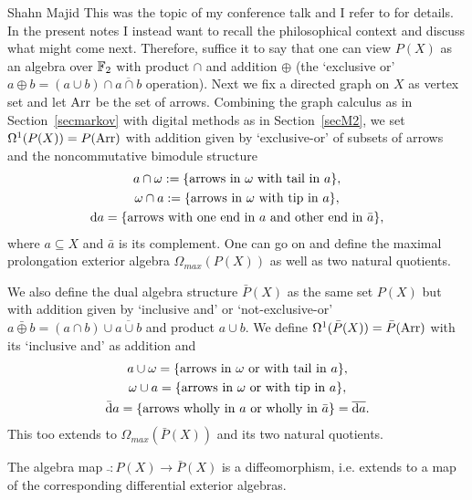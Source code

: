 \begin{artengenv}{Shahn Majid}
This was the topic of my conference talk and I refer to \parencite{Ma:boo} for details. In the present notes I instead want to recall the philosophical context and discuss what might come next. Therefore, suffice it to say that one can view $P(X)$ as an algebra over ${\mathbb{F}}_2$ with product $\cap$ and addition $\oplus$ (the `exclusive or' $a\oplus b=(a\cup b)\cap\overline{a\cap b}$ operation). Next we fix a directed graph on $X$ as vertex set and let ${\rm Arr}$ be the set of arrows. Combining the graph calculus as in Section~\ref{secmarkov} with digital methods as in Section~\ref{secM2}, we set $\Omega^1(P(X))=P({\rm Arr})$ with addition given by `exclusive-or' of subsets of arrows and the noncommutative bimodule structure \parencite{Ma:boo} 
\[\begin{gathered}
a\cap\omega:=\{{\rm arrows\ in\ }\omega\ {\rm with\ tail\ in\ }a\},\\
\omega\cap a:=\{{\rm arrows\ in\ }\omega\ {\rm with\ tip\ in\ }a\},\\
\extd a=\{{\rm arrows\ with\ one\ end\ in\ }a\ {\rm and\ other\ end\ in\ }\bar a\},
\end{gathered} \]
where $a\subseteq X$ and $\bar a$ is its complement. One can go on and define the maximal prolongation exterior algebra $\Omega_{max}(P(X))$ as well as two natural quotients. 

We also define the dual algebra structure $\bar P(X)$ as the same set $P(X)$ but with addition given by `inclusive and' or `not-exclusive-or' $a\bar\oplus b=(a\cap b) \cup \overline{a\cup b}$ and product $a\cup b$. We define $\Omega^1(\bar P(X))=\bar P({\rm Arr})$ with its `inclusive and'  as addition and \parencite{Ma:boo} 
\[\begin{gathered}
a\cup \omega=\{{\rm arrows\ in\ }\omega\ {\rm or\ with\ tail\ in\ }a\},\\
\omega\cup a=\{{\rm arrows\ in\ }\omega\ {\rm or\ with\ tip\ in\ }a\},\\
\bar \extd a= \{{\rm arrows\ wholly\ in\ }a\ {\rm or\ wholly\ in\ }\bar a\}=\overline{\extd a}.
\end{gathered} \]
This too extends to $\Omega_{max}(\bar P(X))$ and its two natural quotients. 

\begin{theorem} \parencite{Ma:boo}\label{thdeM} The algebra map $\bar{\ }: P(X)\to \bar P(X)$ is a diffeomorphism, i.e. extends to a map of the corresponding differential exterior algebras.
\end{theorem}


\end{artengenv}
